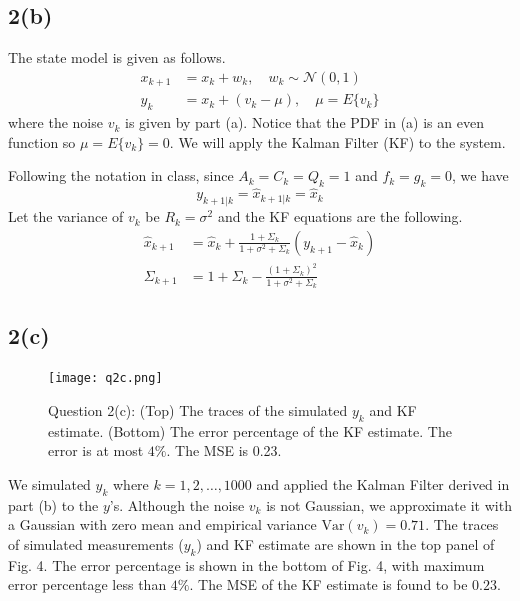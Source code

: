 \documentclass[a4paper, 11pt]{article}
\begin{document}
\subsection*{2(b)}

The state model is given as follows. 
\begin{equation}
\begin{split}
x_{k+1} & = x_k + w_k, \quad w_k\sim\mathcal{N}(0,1)\\
y_k & = x_k + \left(v_k - \mu \right), \quad \mu = E\{v_k\}
\end{split}
\end{equation}
where the noise $v_k$ is given by part (a). Notice that the PDF in (a) is an even function so $\mu =  E\{v_k\} = 0$. We will apply the Kalman Filter (KF) to the system. 

Following the notation in class, since $A_k = C_k = Q_k = 1$ and $f_k = g_k = 0$, we have 
\begin{equation}
y_{k+1|k} = \hat{x}_{k+1|k} = \hat{x}_k
\end{equation}
Let the variance of $v_k$ be $R_{k}=\sigma^2$ and the KF equations are the following. 
\begin{equation}
\begin{split}
\hat{x}_{k+1} & = \hat{x}_k + \frac{1 + \Sigma_k}{1 + \sigma^2 + \Sigma_k}\left( y_{k+1} - \hat{x}_k \right) \\
\Sigma_{k+1} & = 1 + \Sigma_k - \frac{(1 + \Sigma_k)^2}{1 + \sigma^2 + \Sigma_k}
\end{split}
\end{equation}


\subsection*{2(c)}

\begin{figure}
	\begin{center}
		\texttt{[image: q2c.png]}
		\caption{Question 2(c): (Top) The traces of the simulated $y_k$ and KF estimate. (Bottom) The error percentage of the KF estimate. The error is at most $4\%$. The MSE is 0.23. }
	\end{center}
\end{figure}

We simulated $y_k$ where $k=1,2,\dots,1000$ and applied the Kalman Filter derived in part (b) to the $y$'s. Although the noise $v_k$ is not Gaussian, we approximate it with a Gaussian with zero mean and empirical variance $\text{Var}(v_k) = 0.71$. The traces of simulated measurements ($y_k$) and KF estimate are shown in the top panel of Fig. 4. The error percentage is shown in the bottom of Fig. 4, with maximum error percentage less than $4\%$. The MSE of the KF estimate is found to be $0.23$. 
\end{document}
